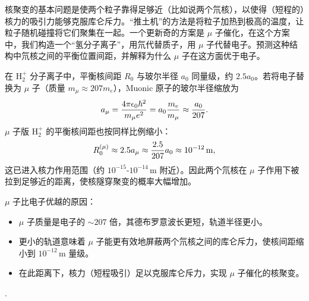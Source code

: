 \begin{question}
核聚变的基本问题是使两个粒子靠得足够近（比如说两个氘核），以使得（短程的）核力的吸引力能够克服库仑斥力。“推土机”的方法是将粒子加热到极高的温度，让粒子随机碰撞将它们聚集在一起。一个更新奇的方案是 $\mu$ 子催化，在这个方案中，我们构造一个“氢分子离子”，用氘代替质子，用 $\mu$ 子代替电子。预测这种结构中氘核之间的平衡位置间距，并解释为什么 $\mu$ 子在这方面优于电子。
\end{question}
\begin{solution}
在 $\mathrm H_2^+$ 分子离子中，平衡核间距 $R_0$ 与玻尔半径 $a_0$ 同量级，约 $2.5a_0$。若将电子替换为 $\mu$ 子（质量 $m_\mu\approx207m_e$），Muonic 原子的玻尔半径缩放为
\[
a_\mu={4\pi\epsilon_0\hbar^2\over m_\mu e^2}=a_0{m_e\over m_\mu}\approx{a_0\over207}.
\]
$\mu$ 子版 $\mathrm H_2^+$ 的平衡核间距也按同样比例缩小：
\[
R_0^{(\mu)}\approx2.5a_\mu\approx{2.5\over207}a_0\approx10^{-12}\,\mathrm{m},
\]
这已进入核力作用范围（约 $10^{-15}\text{-}10^{-14}\,\mathrm{m}$ 附近）。因此两个氘核在 $\mu$ 子作用下被拉到足够近的距离，使核隧穿聚变的概率大幅增加。

$\mu$ 子比电子优越的原因：
\begin{itemize}
\item $\mu$ 子质量是电子的 $\sim207$ 倍，其德布罗意波长更短，轨道半径更小。
\item 更小的轨道意味着 $\mu$ 子能更有效地屏蔽两个氘核之间的库仑斥力，使核间距缩小到 $10^{-12}\,\mathrm{m}$ 量级。
\item 在此距离下，核力（短程吸引）足以克服库仑斥力，实现 $\mu$ 子催化的核聚变。
\end{itemize}
.
\end{solution}

